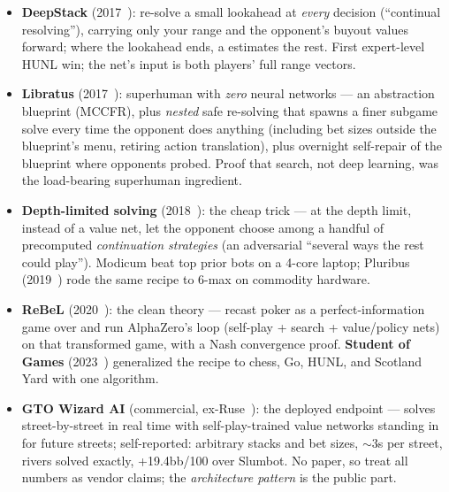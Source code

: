 \begin{itemize}
\item \textbf{DeepStack} (2017~\cite{deepstack}): re-solve a small lookahead at \emph{every} decision (``continual resolving''), carrying only your range and the opponent's buyout values forward; where the lookahead ends, a  estimates the rest. First expert-level HUNL win; the net's input is both players' full range vectors.
\item \textbf{Libratus} (2017~\cite{libratus}): superhuman with \emph{zero} neural networks --- an abstraction blueprint (MCCFR), plus \emph{nested} safe re-solving that spawns a finer subgame solve every time the opponent does anything (including bet sizes outside the blueprint's menu, retiring action translation), plus overnight self-repair of the blueprint where opponents probed. Proof that search, not deep learning, was the load-bearing superhuman ingredient.
\item \textbf{Depth-limited solving} (2018~\cite{brown2018dls}): the cheap trick --- at the depth limit, instead of a value net, let the opponent choose among a handful of precomputed \emph{continuation strategies} (an adversarial ``several ways the rest could play''). Modicum beat top prior bots on a 4-core laptop; Pluribus (2019~\cite{pluribus}) rode the same recipe to 6-max on commodity hardware.
\item \textbf{ReBeL} (2020~\cite{rebel}): the clean theory --- recast poker as a perfect-information game over  and run AlphaZero's loop (self-play + search + value/policy nets) on that transformed game, with a Nash convergence proof. \textbf{Student of Games} (2023~\cite{sog}) generalized the recipe to chess, Go, HUNL, and Scotland Yard with one algorithm.
\item \textbf{GTO Wizard AI} (commercial, ex-Ruse~\cite{gtowizardai}): the deployed endpoint --- solves street-by-street in real time with self-play-trained value networks standing in for future streets; self-reported: arbitrary stacks and bet sizes, $\sim$3s per street, rivers solved exactly, +19.4bb/100 over Slumbot. No paper, so treat all numbers as vendor claims; the \emph{architecture pattern} is the public part.
\end{itemize}

